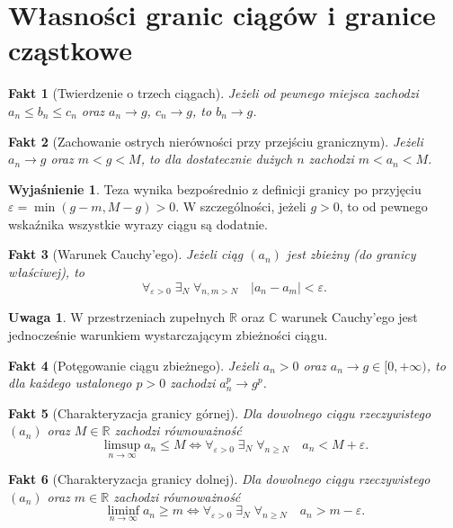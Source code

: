 \documentclass[11pt, a4paper]{article}
\theoremstyle{plain}
\newtheorem{fakt}{Fakt}
\theoremstyle{definition}
\newtheorem*{wyjasnienie}{Wyjaśnienie}
\newtheorem*{uwaga}{Uwaga}
\begin{document}
\section{Własności granic ciągów i granice cząstkowe}

\begin{fakt}[Twierdzenie o trzech ciągach]
Jeżeli od pewnego miejsca zachodzi $a_n \leqslant b_n \leqslant c_n$ oraz $a_n \to g$, $c_n \to g$, to $b_n \to g$.
\end{fakt}

\begin{fakt}[Zachowanie ostrych nierówności przy przejściu granicznym]
Jeżeli $a_n \to g$ oraz $m < g < M$, to dla dostatecznie dużych $n$ zachodzi $m < a_n < M$.
\end{fakt}

\begin{wyjasnienie}
Teza wynika bezpośrednio z definicji granicy po przyjęciu $\varepsilon = \min(g - m, M - g) > 0$. W szczególności, jeżeli $g > 0$, to od pewnego wskaźnika wszystkie wyrazy ciągu są dodatnie.
\end{wyjasnienie}

\begin{fakt}[Warunek Cauchy'ego]
Jeżeli ciąg $(a_n)$ jest zbieżny (do granicy właściwej), to
\[
\forall_{\varepsilon > 0} \; \exists_{N} \; \forall_{n, m > N} \quad \lvert a_n - a_m \rvert < \varepsilon.
\]
\end{fakt}

\begin{uwaga}
W przestrzeniach zupełnych $\mathbb{R}$ oraz $\mathbb{C}$ warunek Cauchy'ego jest jednocześnie warunkiem wystarczającym zbieżności ciągu.
\end{uwaga}

\begin{fakt}[Potęgowanie ciągu zbieżnego]
Jeżeli $a_n > 0$ oraz $a_n \to g \in [0, +\infty)$, to dla każdego ustalonego $p > 0$ zachodzi $a_n^p \to g^p$.
\end{fakt}

\begin{fakt}[Charakteryzacja granicy górnej]
Dla dowolnego ciągu rzeczywistego $(a_n)$ oraz $M \in \mathbb{R}$ zachodzi równoważność
\[
\limsup_{n\to\infty} a_n \leqslant M \iff \forall_{\varepsilon > 0} \; \exists_{N} \; \forall_{n \geqslant N} \quad a_n < M + \varepsilon.
\]
\end{fakt}

\begin{fakt}[Charakteryzacja granicy dolnej]
Dla dowolnego ciągu rzeczywistego $(a_n)$ oraz $m \in \mathbb{R}$ zachodzi równoważność
\[
\liminf_{n\to\infty} a_n \geqslant m \iff \forall_{\varepsilon > 0} \; \exists_{N} \; \forall_{n \geqslant N} \quad a_n > m - \varepsilon.
\]
\end{fakt}
\end{document}
